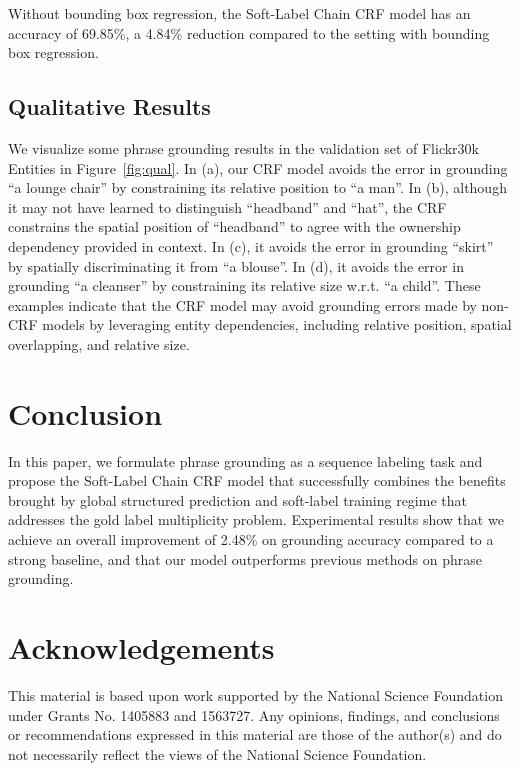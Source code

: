 \documentclass[11pt,a4paper]{article}
\begin{document}
Without bounding box regression, the Soft-Label Chain CRF model has an accuracy of 69.85\%, a 4.84\% reduction compared to the setting with bounding box regression. 

\subsection{Qualitative Results}

We visualize some phrase grounding results in the validation set of Flickr30k Entities in Figure~\ref{fig:qual}. In (a), our CRF model avoids the error in grounding ``a lounge chair'' by constraining its relative position to ``a man''. In (b), although it may not have learned to distinguish ``headband'' and ``hat'', the CRF constrains the spatial position of ``headband'' to agree with the ownership dependency provided in context. In (c), it avoids the error in grounding ``skirt'' by spatially discriminating it from ``a blouse''. In (d), it avoids the error in grounding ``a cleanser'' by constraining its relative size w.r.t. ``a child''. These examples indicate that the CRF model may avoid grounding errors made by non-CRF models by leveraging entity dependencies, including relative position, spatial overlapping, and relative size. 

\section{Conclusion}
\label{sec:conclusion}

In this paper, we formulate phrase grounding as a sequence labeling task and propose the Soft-Label Chain CRF model that successfully combines the benefits brought by global structured prediction and soft-label training regime that addresses the gold label multiplicity problem. Experimental results show that we achieve an overall improvement of 2.48\% on grounding accuracy compared to a strong baseline, and that our model outperforms previous methods on phrase grounding. 

\section{Acknowledgements}
\label{sec:ack}
This material is based upon work supported by the National Science Foundation under Grants No. 1405883 and 1563727. Any opinions, findings, and conclusions or recommendations expressed in this material are those of the author(s) and do not necessarily reflect the views of the National Science Foundation. 



\end{document}
